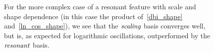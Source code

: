 \begin{figure}[!pth]
\centering     %
\caption{
    For the more complex case of a resonant
    feature with scale and shape dependence (in this case the product of~\eqref{dbi_shape}
    and~\eqref{ln_cos_shape}), we see that the $\textit{scaling}$ basis converges well,
    but is, as expected for logarithmic oscillations, outperformed by the $\textit{resonant}$ basis.
}\label{fig:log_recon_osc_dbiosc}
\end{figure}

